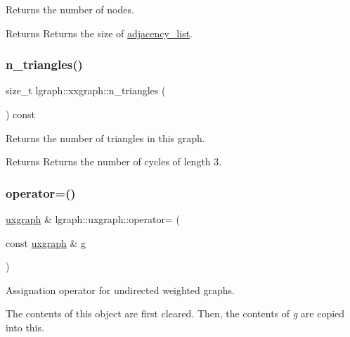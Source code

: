 Returns the number of nodes. 

\begin{DoxyReturn}{Returns}
Returns the size of \hyperlink{classlgraph_1_1xxgraph_a31cf82d0b20be05290be259dc97a51ec}{adjacency\+\_\+list}. 
\end{DoxyReturn}
\mbox{\label{classlgraph_1_1xxgraph_a90a9b60caf18179576af61dc962b95e3}} 
\subsubsection{\texorpdfstring{n\+\_\+triangles()}{n\_triangles()}}
{\footnotesize\ttfamily size\+\_\+t lgraph\+::xxgraph\+::n\+\_\+triangles (\begin{DoxyParamCaption}{ }\end{DoxyParamCaption}) const\hspace{0.3cm}{\ttfamily [inherited]}}



Returns the number of triangles in this graph. 

\begin{DoxyReturn}{Returns}
Returns the number of cycles of length 3. 
\end{DoxyReturn}
\mbox{\label{classlgraph_1_1uxgraph_ac46d439a1620885943a55a3338f9474f}} 
\subsubsection{\texorpdfstring{operator=()}{operator=()}}
{\footnotesize\ttfamily \hyperlink{classlgraph_1_1uxgraph}{uxgraph} \& lgraph\+::uxgraph\+::operator= (\begin{DoxyParamCaption}\item[{const \hyperlink{classlgraph_1_1uxgraph}{uxgraph} \&}]{g }\end{DoxyParamCaption})}



Assignation operator for undirected weighted graphs. 

The contents of this object are first cleared. Then, the contents of {\itshape g} are copied into this.


